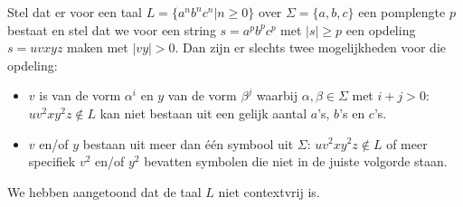Stel dat er voor een taal $L = \{a^nb^nc^n|n\geq 0\}$ over $\Sigma = \{a,b,c\}$ een pomplengte $p$ bestaat en stel dat we voor een string $s = a^pb^pc^p$ met $|s| \geq p$ een opdeling $s=uvxyz$ maken met $|vy| > 0$. Dan zijn er slechts twee mogelijkheden voor die opdeling:
\begin{itemize}
\item $v$ is van de vorm $\alpha^i$ en $y$ van de vorm $\beta^j$ waarbij $\alpha,\beta \in \Sigma$ met $i+j>0$: $uv^2xy^2z \notin L$ kan niet bestaan uit een gelijk aantal $a$'s, $b$'s en $c$'s.
\item $v$ en/of $y$ bestaan uit meer dan \'e\'en symbool uit $\Sigma$: $uv^2xy^2z \notin L$ of meer specifiek $v^2$ en/of $y^2$ bevatten symbolen die niet in de juiste volgorde staan.
\end{itemize}

We hebben aangetoond dat de taal $L$ niet contextvrij is.